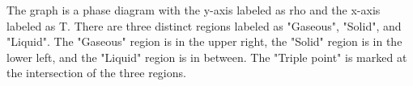 The graph is a phase diagram with the y-axis labeled as rho and the x-axis labeled as T. There are three distinct regions labeled as "Gaseous", "Solid", and "Liquid". The "Gaseous" region is in the upper right, the "Solid" region is in the lower left, and the "Liquid" region is in between. The "Triple point" is marked at the intersection of the three regions.